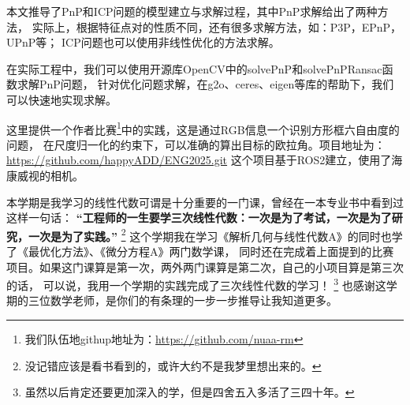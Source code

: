 本文推导了PnP和ICP问题的模型建立与求解过程，其中PnP求解给出了两种方法，
实际上，根据特征点对的性质不同，还有很多求解方法，如：P3P，EPnP，UPnP等；
ICP问题也可以使用非线性优化的方法求解。

在实际工程中，我们可以使用开源库OpenCV中的solvePnP和solvePnPRansac函数求解PnP问题，
针对优化问题求解，在g2o、ceres、eigen等库的帮助下，我们可以快速地实现求解。

这里提供一个作者比赛\footnote{我们队伍地githup地址为：\url{https://github.com/nuaa-rm}}中的实践，这是通过RGB信息一个识别方形框六自由度的问题，
在尺度归一化的约束下，可以准确的算出目标的欧拉角。项目地址为：\url{https://github.com/happyADD/ENG2025.git}
这个项目基于ROS2建立，使用了海康威视的相机。

本学期是我学习的线性代数可谓是十分重要的一门课，曾经在一本专业书中看到过这样一句话：
\textbf{“工程师的一生要学三次线性代数：一次是为了考试，一次是为了研究，一次是为了实践。”}
\footnote{没记错应该是看书看到的，或许大约不是我梦里想出来的。}
这个学期我在学习《解析几何与线性代数A》的同时也学了《最优化方法》、《微分方程A》两门数学课，
同时还在完成着上面提到的比赛项目。如果这门课算是第一次，两外两门课算是第二次，自己的小项目算是第三次的话，
可以说，我用一个学期的实践完成了三次线性代数的学习！
\footnote{虽然以后肯定还要更加深入的学，但是四舍五入多活了三四十年。}
也感谢这学期的三位数学老师，是你们的有条理的一步一步推导让我知道更多。
